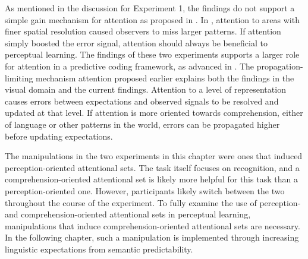 As mentioned in the discussion for Experiment 1, the findings do not support a simple gain mechanism for attention as proposed in \citet{Clark2013}.  
In \citet{Yeshurun1998}, attention to areas with finer spatial resolution caused observers to miss larger patterns.  
If attention simply boosted the error signal, attention should always be beneficial to perceptual learning.
The findings of these two experiments supports a larger role for attention in a predictive coding framework, as advanced in \citet{Block2013}.
The propagation-limiting mechanism attention proposed earlier explains both the findings in the visual domain and the current findings.
Attention to a level of representation causes errors between expectations and observed signals to be resolved and updated at that level.
If attention is more oriented towards comprehension, either of language or other patterns in the world, errors can be propagated higher before updating expectations.

The manipulations in the two experiments in this chapter were ones that induced perception-oriented attentional sets.
The task itself focuses on recognition, and a comprehension-oriented attentional set is likely more helpful for this task than a perception-oriented one.
However, participants likely switch between the two throughout the course of the experiment.
To fully examine the use of perception- and comprehension-oriented attentional sets in perceptual learning, manipulations that induce comprehension-oriented attentional sets are necessary.
In the following chapter, such a manipulation is implemented through increasing linguistic expectations from semantic predictability.




